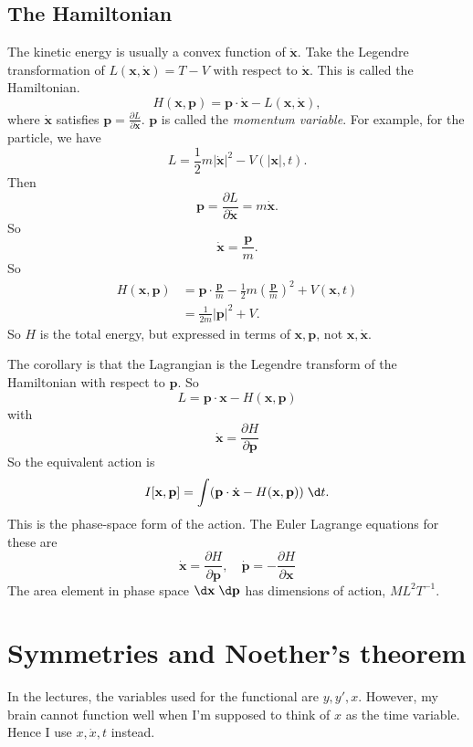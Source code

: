\documentclass[a4paper]{article}
\begin{document}
\subsection{The Hamiltonian}
The kinetic energy is usually a convex function of $\dot{\mathbf{x}}$. Take the Legendre transformation of $L(\mathbf{x}, \dot{\mathbf{x}}) = T - V$ with respect to $\dot{\mathbf{x}}$. This is called the Hamiltonian.
\[
  H(\mathbf{x}, \mathbf{p}) = \mathbf{p}\cdot \dot{\mathbf{x}} - L(\mathbf{x}, \dot{\mathbf{x}}),
\]
where $\dot{\mathbf{x}}$ satisfies $\mathbf{p} = \frac{\partial L}{\partial \dot{\mathbf{x}}}$. $\mathbf{p}$ is called the \emph{momentum variable}. For example, for the particle, we have
\[
  L = \frac{1}{2}m|\dot{\mathbf{x}}|^2 - V(|\mathbf{x}|, t).
\]
Then
\[
  \mathbf{p} = \frac{\partial L}{\partial \dot{\mathbf{x}}} = m\dot{\mathbf{x}}.
\]
So
\[
  \dot{\mathbf{x}} = \frac{\mathbf{p}}{m}.
\]
So
\begin{align*}
  H(\mathbf{x}, \mathbf{p}) &= \mathbf{p}\cdot \frac{\mathbf{p}}{m} - \frac{1}{2}m\left(\frac{\mathbf{p}}{m}\right)^2 + V(\mathbf{x}, t)\\
  &= \frac{1}{2m}|\mathbf{p}|^2 + V.
\end{align*}
So $H$ is the total energy, but expressed in terms of $\mathbf{x}, \mathbf{p}$, not $\mathbf{x}, \dot{\mathbf{x}}$.

The corollary is that the Lagrangian is the Legendre transform of the Hamiltonian with respect to $\mathbf{p}$. So
\[
  L = \mathbf{p}\cdot \mathbf{x} - H(\mathbf{x}, \mathbf{p})
\]
with
\[
  \dot{\mathbf{x}} = \frac{\partial H}{\partial \mathbf{p}}
\]
So the equivalent action is
\[
  I[\mathbf{x}, \mathbf{p}] = \int (\mathbf{p}\cdot \dot{\mathbf{x}} - H(\mathbf{x}, \mathbf{p}))\;\d t.
\]
This is the phase-space form of the action. The Euler Lagrange equations for these are
\[
  \dot{\mathbf{x}} = \frac{\partial H}{\partial \mathbf{p}}, \quad \dot{\mathbf{p}} = -\frac{\partial H}{\partial \mathbf{x}}
\]
The area element in phase space $\d \mathbf{x}\; \d \mathbf{p}$  has dimensions of action, $ML^2T^{-1}$.

\section{Symmetries and Noether's theorem}
\note In the lectures, the variables used for the functional are $y, y', x$. However, my brain cannot function well when I'm supposed to think of $x$ as the time variable. Hence I use $x, \dot{x}, t$ instead.
\end{document}
